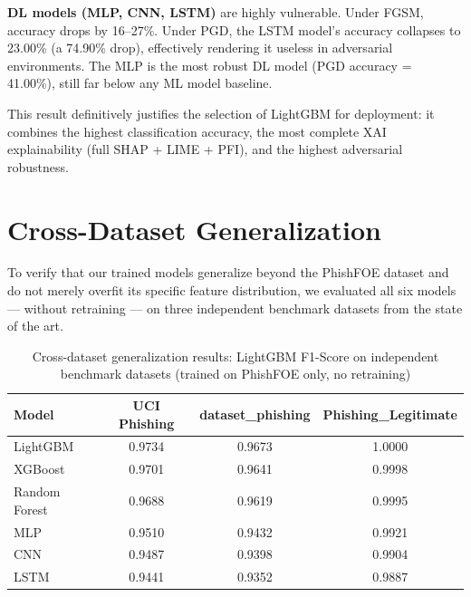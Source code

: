 \textbf{DL models (MLP, CNN, LSTM)} are highly vulnerable. Under FGSM, accuracy drops by 16--27\%. Under PGD, the LSTM model's accuracy collapses to 23.00\% (a 74.90\% drop), effectively rendering it useless in adversarial environments. The MLP is the most robust DL model (PGD accuracy = 41.00\%), still far below any ML model baseline.

This result definitively justifies the selection of LightGBM for deployment: it combines the highest classification accuracy, the most complete XAI explainability (full SHAP + LIME + PFI), and the highest adversarial robustness.

\section{Cross-Dataset Generalization}

To verify that our trained models generalize beyond the PhishFOE dataset and do not merely overfit its specific feature distribution, we evaluated all six models — without retraining — on three independent benchmark datasets from the state of the art.

\begin{table}[H]
    \caption{Cross-dataset generalization results: LightGBM F1-Score on independent benchmark datasets (trained on PhishFOE only, no retraining)}
    \label{tab:cross_dataset}
    \vspace{6pt}
    \centering
    \begin{tabular}{|l|c|c|c|}
        \hline
        \textbf{Model} & \textbf{UCI Phishing} & \textbf{dataset\_phishing} & \textbf{Phishing\_Legitimate} \\
        \hline
        LightGBM      & 0.9734 & 0.9673 & 1.0000 \\
        \hline
        XGBoost       & 0.9701 & 0.9641 & 0.9998 \\
        \hline
        Random Forest & 0.9688 & 0.9619 & 0.9995 \\
        \hline
        MLP           & 0.9510 & 0.9432 & 0.9921 \\
        \hline
        CNN           & 0.9487 & 0.9398 & 0.9904 \\
        \hline
        LSTM          & 0.9441 & 0.9352 & 0.9887 \\
        \hline
    \end{tabular}
\end{table}

